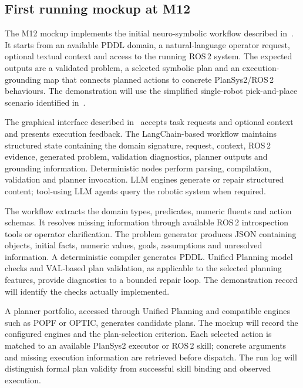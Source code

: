 \documentclass{plan4ari_report}
\begin{document}
\subsection{First running mockup at M12}\label{sec:mockup}
The M12 mockup implements the initial neuro-symbolic workflow described in~\cite[Sec.~2.1, Fig.~1 and Sec.~3]{sandrini2026proposal}. It starts from an available PDDL domain, a natural-language operator request, optional textual context and access to the running ROS\,2 system. The expected outputs are a validated problem, a selected symbolic plan and an execution-grounding map that connects planned actions to concrete PlanSys2/ROS\,2 behaviours. The demonstration will use the simplified single-robot pick-and-place scenario identified in~\cite{sandrini2026proposal}.

 The graphical interface described in~\cite[Fig.~4]{sandrini2026proposal} accepts task requests and optional context and presents execution feedback. The LangChain-based workflow maintains structured state containing the domain signature, request, context, ROS\,2 evidence, generated problem, validation diagnostics, planner outputs and grounding information. Deterministic nodes perform parsing, compilation, validation and planner invocation. LLM engines generate or repair structured content; tool-using LLM agents query the robotic system when required.

 The workflow extracts the domain types, predicates, numeric fluents and action schemas. It resolves missing information through available ROS\,2 introspection tools or operator clarification. The problem generator produces JSON containing objects, initial facts, numeric values, goals, assumptions and unresolved information. A deterministic compiler generates PDDL. Unified Planning model checks and VAL-based plan validation, as applicable to the selected planning features, provide diagnostics to a bounded repair loop. The demonstration record will identify the checks actually implemented.

 A planner portfolio, accessed through Unified Planning and compatible engines such as POPF or OPTIC, generates candidate plans. The mockup will record the configured engines and the plan-selection criterion. Each selected action is matched to an available PlanSys2 executor or ROS\,2 skill; concrete arguments and missing execution information are retrieved before dispatch. The run log will distinguish formal plan validity from successful skill binding and observed execution.
\end{document}
